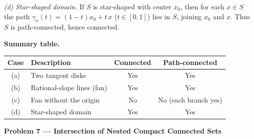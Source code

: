\begin{problem}[CP-II-0514]
	\medskip

	\textit{(d) Star-shaped domain.}
	If $S$ is star-shaped with center $x_0$,
	then for each $x\in S$ the path
	$\gamma_x(t)=(1-t)x_0+t\,x$ ($t\in[0,1]$)
	lies in $S$, joining $x_0$ and $x$.
	Thus $S$ is path-connected, hence connected.


	\textbf{Summary table.}

	\begin{center}
		\begin{tabular}{c|l|c|c}
			Case & Description & Connected & Path-connected\\\hline
			(a) & Two tangent disks & Yes & Yes\\
			(b) & Rational-slope lines (fan) & Yes & Yes\\
			(c) & Fan without the origin & No & No (each branch yes)\\
			(d) & Star-shaped domain & Yes & Yes
		\end{tabular}
	\end{center}

	\par\medskip\noindent\textbf{Problem 7 --- Intersection of Nested Compact Connected Sets}\par
\end{problem}

